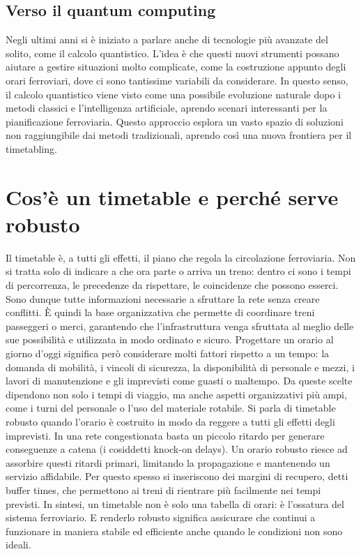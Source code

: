 \documentclass[a4paper,12pt]{report}
\begin{document}
\subsection{Verso il quantum computing}
Negli ultimi anni si è iniziato a parlare anche di tecnologie più avanzate del solito, come il calcolo quantistico. L’idea è che questi nuovi strumenti possano aiutare a gestire situazioni molto complicate, come la costruzione appunto degli orari ferroviari, dove ci sono tantissime variabili da considerare. In questo senso, il calcolo quantistico viene visto come una possibile evoluzione naturale dopo i metodi classici e l’intelligenza artificiale, aprendo scenari interessanti per la pianificazione ferroviaria.
Questo approccio esplora un vasto spazio di soluzioni non raggiungibile dai metodi tradizionali, aprendo così una nuova frontiera per il timetabling.

\section{Cos’è un timetable e perché serve robusto}
Il timetable è, a tutti gli effetti, il piano che regola la circolazione ferroviaria. Non si tratta solo di indicare a che ora parte o arriva un treno: dentro ci sono i tempi di percorrenza, le precedenze da rispettare, le coincidenze che possono esserci. Sono dunque tutte informazioni necessarie a sfruttare la rete senza creare conflitti. 
È quindi la base organizzativa che permette di coordinare treni passeggeri o merci, garantendo che l’infrastruttura venga sfruttata al meglio delle sue possibilità e utilizzata in modo ordinato e sicuro.
Progettare un orario al giorno d'oggi significa però considerare molti fattori rispetto a un tempo: la domanda di mobilità, i vincoli di sicurezza, la disponibilità di personale e mezzi, i lavori di manutenzione e gli imprevisti come guasti o maltempo. Da queste scelte dipendono non solo i tempi di viaggio, ma anche aspetti organizzativi più ampi, come i turni del personale o l’uso del materiale rotabile.
Si parla di timetable robusto quando l’orario è costruito in modo da reggere a tutti gli effetti degli imprevisti. In una rete congestionata basta un piccolo ritardo per generare conseguenze a catena (i cosiddetti knock-on delays). Un orario robusto riesce ad assorbire questi ritardi primari, limitando la propagazione e mantenendo un servizio affidabile. Per questo spesso si inseriscono dei margini di recupero, detti buffer times, che permettono ai treni di rientrare più facilmente nei tempi previsti.
In sintesi, un timetable non è solo una tabella di orari: è l’ossatura del sistema ferroviario. E renderlo robusto significa assicurare che continui a funzionare in maniera stabile ed efficiente anche quando le condizioni non sono ideali.
\end{document}

